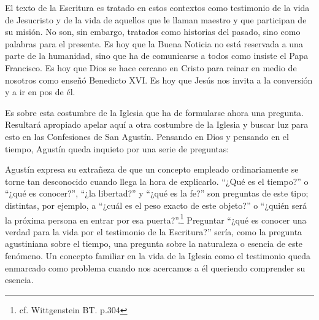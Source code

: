       El texto de la Escritura es tratado en estos contextos como testimonio de la
      vida de Jesucristo y de la vida de aquellos que le llaman maestro y que
      participan de su misión. No son, sin embargo, tratados como historias del
      pasado, sino como palabras para el presente. Es hoy que la Buena Noticia no está
      reservada a una parte de la humanidad, sino que ha de comunicarse a todos como
      insiste el Papa Francisco. Es hoy que Dios se hace cercano en Cristo para reinar
      en medio de nosotros como enseñó Benedicto XVI. Es hoy que Jesús nos invita a la
      conversión y a ir en pos de él.

      Es sobre esta costumbre de la Iglesia que ha de formularse ahora una pregunta.
      Resultará apropiado apelar aquí a otra costumbre de la Iglesia y buscar luz para
      esto en las Confesiones de San Agustín. Pensando en Dios y pensando en el
      tiempo, Agustín queda inquieto por una serie de preguntas: 

      Agustín expresa su extrañeza de que un concepto empleado ordinariamente se
      torne tan desconocido cuando llega la hora de explicarlo. ``¿Qué es el
      tiempo?'' o ``¿qué es conocer?'', ``¿la libertad?'' y ``¿qué es la fe?'' son
      preguntas de este tipo; distintas, por ejemplo, a ``¿cuál es el peso exacto de
      este objeto?'' o ``¿quién será la próxima persona en entrar por esa
      puerta?''.\footnote{cf. Wittgenstein BT. p.304} Preguntar ``¿qué es conocer una
      verdad para la vida por el testimonio de la Escritura?'' sería, como la pregunta
      agustiniana sobre el tiempo, una pregunta sobre la naturaleza o esencia de
      este fenómeno. Un concepto familiar en la vida de la Iglesia como el
      testimonio queda enmarcado como problema cuando nos acercamos a él queriendo
      comprender su esencia.

